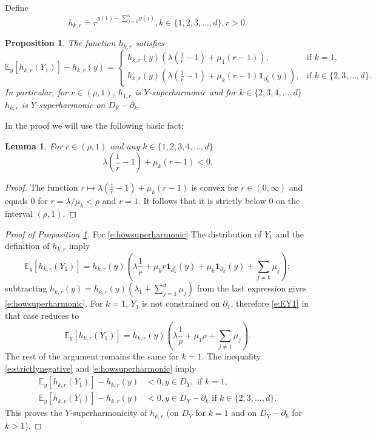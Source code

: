 \documentclass[11pt,a4paper]{article}
\newtheorem{lemma}{Lemma}
\newtheorem{proposition}{Proposition}[section]
\begin{document}
Define
\[
h_{k,r} \doteq r^{y(1) - \sum_{j=2}^k y(j)}, k  \in \{1,2,3,...,d\}, r > 0.
\]
\begin{proposition}\label{p:hkr}
The function $h_{k,r}$ satisfies
\begin{equation}\label{e:howsuperharmonic}
{\mathbb E}_y[h_{k,r}(Y_1)] -h_{k,r}(y) =
\begin{cases}
h_{k,r}(y) \left(
\lambda \left(\frac{1}{r}-1\right) + \mu_1 (r-1)\right), &\text{if } k=1,\\
h_{k,r}(y) \left(
\lambda \left(\frac{1}{r}-1\right) + \mu_k (r-1) {\bm 1}_{\partial_k^c}(y)\right),
&\text{if } k \in \{2,3,...,d\}.
\end{cases}
\end{equation}
In particular, for $r \in (\rho,1)$,  $h_{1,r}$ is $Y$-superharmonic and for 
$k \in \{2,3,4,...,d\}$ $h_{k,r}$ is $Y$-superharmonic on $D_Y - \partial_k.$
\end{proposition}
In the proof we will use the following basic fact:
\begin{lemma}
For $r \in (\rho,1)$ and any $k \in \{1,2,3,4,...,d\}$
\begin{equation}\label{e:strictlynegative}
\lambda (\frac{1}{r}-1) + \mu_k (r-1) < 0.
\end{equation}
\end{lemma}
\begin{proof}
The function
$r\mapsto \lambda (\frac{1}{r}-1) + \mu_k (r-1)$
is convex for $r \in (0,\infty)$ and equals $0$ for $r=\lambda/\mu_k < \rho$
and $r=1$. It follows that it is strictly below $0$ on the interval
$(\rho,1).$ 
\end{proof}
\begin{proof}[Proof of Proposition \ref{p:hkr}]
For \eqref{e:howsuperharmonic}
The distribution of $Y_1$
and the definition of $h_{k,r}$ imply
\begin{equation}\label{e:EY1}
{\mathbb E}_y[h_{k,r}(Y_1)] =
h_{k,r}(y) \left(
\lambda \frac{1}{r} + \mu_k r{\bm 1}_{\partial_k^c}(y)
+ \mu_k {\bm 1}_{\partial_k}(y) + \sum_{j \neq k} \mu_j \right);
\end{equation}
subtracting $ h_{k,r}(y) = h_{k,r}(y) \left( \lambda_1 + \sum_{j=1}^d \mu_j\right)$ from the last expression gives \eqref{e:howsuperharmonic}.
For $k=1$, $Y_1$ is not constrained on $\partial_1$, therefore
\eqref{e:EY1} in that case reduces to
\[
{\mathbb E}_y[h_{k,r}(Y_1)] =
h_{k,r}(y) \left(
\lambda \frac{1}{\rho} + \mu_1 \rho + \sum_{j \neq 1} \mu_j \right).
\]
The rest of the argument remains the same for $k=1.$
The inequality \eqref{e:strictlynegative} and \eqref{e:howsuperharmonic} imply
\begin{align*}
{\mathbb E}_y[h_{k,r}(Y_1)] -h_{k,r}(y) &< 0 , y \in D_Y, \text{ if } k=1,\\
{\mathbb E}_y[h_{k,r}(Y_1)] -h_{k,r}(y) &< 0 ,  y \in D_Y -\partial_k\text{ if } k\in \{2,3,...,d\}.
\end{align*}
This proves the $Y$-superharmonicity of $h_{k,r}$ (on $D_Y$ for $k=1$
and on $D_Y-\partial_k$ for $k> 1$).
\end{proof}
\end{document}
